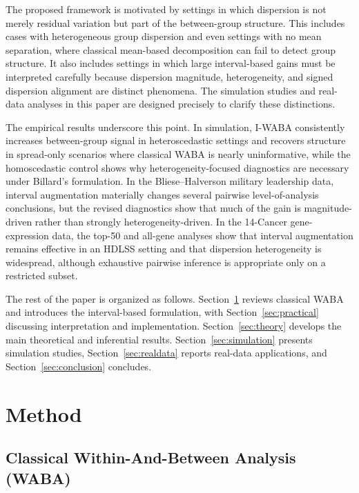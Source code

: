 \documentclass[preprint, times, 12pt, authoryear]{elsarticle}
\begin{document}
The proposed framework is motivated by settings in which dispersion is not merely residual variation but part of the between-group structure. This includes cases with heterogeneous group dispersion and even settings with no mean separation, where classical mean-based decomposition can fail to detect group structure. It also includes settings in which large interval-based gains must be interpreted carefully because dispersion magnitude, heterogeneity, and signed dispersion alignment are distinct phenomena. The simulation studies and real-data analyses in this paper are designed precisely to clarify these distinctions.

The empirical results underscore this point. In simulation, I-WABA consistently increases between-group signal in heteroscedastic settings and recovers structure in spread-only scenarios where classical WABA is nearly uninformative, while the homoscedastic control shows why heterogeneity-focused diagnostics are necessary under Billard's formulation. In the Bliese--Halverson military leadership data, interval augmentation materially changes several pairwise level-of-analysis conclusions, but the revised diagnostics show that much of the gain is magnitude-driven rather than strongly heterogeneity-driven. In the 14-Cancer gene-expression data, the top-50 and all-gene analyses show that interval augmentation remains effective in an HDLSS setting and that dispersion heterogeneity is widespread, although exhaustive pairwise inference is appropriate only on a restricted subset.

The rest of the paper is organized as follows. Section~\ref{sec:method} reviews classical WABA and introduces the interval-based formulation, with Section~\ref{sec:practical} discussing interpretation and implementation. Section~\ref{sec:theory} develops the main theoretical and inferential results. Section~\ref{sec:simulation} presents simulation studies, Section~\ref{sec:realdata} reports real-data applications, and Section~\ref{sec:conclusion} concludes.


\section{Method}\label{sec:method}
\subsection{Classical Within-And-Between Analysis (WABA)}\label{sec:classical_waba}
\end{document}
